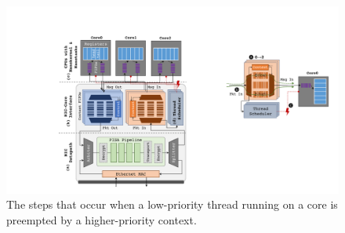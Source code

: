 
\begin{figure}
  \includegraphics[width=0.8\linewidth]{./figures/thread-sched}
  \caption{The steps that occur when a low-priority thread running on a core is preempted by a higher-priority context.}
  \label{fig:nic-scheduler}
\end{figure}